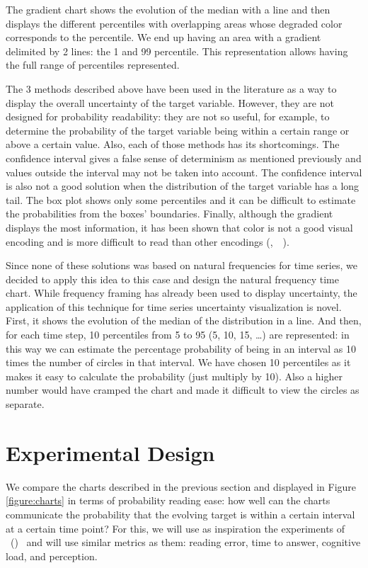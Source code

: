 \documentclass[a4paper,3p,sort&compress]{elsarticle}
\DeclareRobustCommand{\citeext}[1]{\citeauthor{#1},~\citeyear{#1}~\cite{#1}}
\DeclareRobustCommand{\citeextp}[1]{\citeauthor{#1}~(\citeyear{#1})~\cite{#1}}
\begin{document}
The gradient chart shows the evolution of the median with a line and then
displays the different percentiles with overlapping areas whose degraded color
corresponds to the percentile. We end up having an area with a gradient
delimited by 2 lines: the 1 and 99 percentile. This representation
allows having the full range of percentiles represented.

The 3 methods described above have been used in the literature as a way to
display the overall uncertainty of the target variable. However, they are not
designed for probability readability: they are not so useful, for example, to
determine the probability of the target variable being within a certain range or
above a certain value. Also, each of those methods has its shortcomings. The
confidence interval gives a false sense of determinism as mentioned previously
and values outside the interval may not be taken into account. The confidence
interval is also not a good solution when the distribution of the target
variable has a long tail. The box plot shows only some percentiles and it can be
difficult to estimate the probabilities from the boxes' boundaries. Finally,
although the gradient displays the most information, it has been shown that
color is not a good visual encoding and is more difficult to read than other
encodings (\citeext{cleveland_graphical_1984}).

Since none of these solutions was based on natural frequencies for time series,
we decided to apply this idea to this case and design the natural frequency time
chart. While frequency framing has already been used to display uncertainty, the
application of this technique for time series uncertainty visualization is
novel. First, it shows the evolution of the median of the distribution in a
line. And then, for each time step, 10 percentiles from 5 to 95
(5, 10, 15, \ldots) are represented: in this way we can estimate
the percentage probability of being in an interval as 10 times the number of
circles in that interval. We have chosen 10 percentiles as it makes it easy to
calculate the probability (just multiply by 10). Also a higher number would have
cramped the chart and made it difficult to view the circles as separate.

\section{Experimental Design}
\label{sec:exp_design}

We compare the charts described in the previous section and displayed in Figure
\ref{figure:charts} in terms of probability reading ease: how well can the
charts communicate the probability that the evolving target is within a certain
interval at a certain time point? For this, we will use as inspiration the
experiments of \citeextp{brennen_instrument_2018} and will use
similar metrics as them: reading error, time to answer, cognitive load, and
perception.
\end{document}
